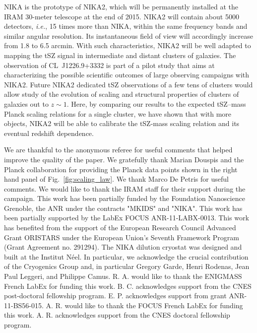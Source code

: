 \documentclass[twocolumn,traditabstract]{aa}
\begin{document}
NIKA is the prototype of NIKA2, which will be permanently installed at the IRAM 30-meter telescope at the end of 2015. NIKA2 will contain about 5000 detectors, {\it i.e.}, 15 times more than NIKA, within the same frequency bands and similar angular resolution. Its instantaneous field of view will accordingly increase from 1.8 to 6.5 arcmin. With such characteristics, NIKA2 will be well adapted to mapping the tSZ signal in intermediate and distant clusters of galaxies. The observation of \mbox{CL~J1226.9+3332} is part of a pilot study that aims at characterizing the possible scientific outcomes of large observing campaigns with NIKA2. Future NIKA2 dedicated tSZ observations of a few tens of clusters would allow study of the evolution of scaling and structural properties of clusters of galaxies out to $z \sim 1$. Here, by comparing our results to the expected tSZ--mass Planck scaling relations for a single cluster, we have shown that with more objects, NIKA2 will be able to calibrate the tSZ-mass scaling relation and its eventual redshift dependence. 

\begin{acknowledgements}
We are thankful to the anonymous referee for useful comments that helped improve the quality of the paper.
We gratefully thank Marian Douspis and the Planck collaboration for providing the Planck data points shown in the right hand panel of Fig.~\ref{fig:scaling_law}.
We thank Marco De Petris for useful comments.
We would like to thank the IRAM staff for their support during the campaign.
This work has been partially funded by the Foundation Nanoscience Grenoble, the ANR under the contracts "MKIDS" and "NIKA". 
This work has been partially supported by the LabEx FOCUS ANR-11-LABX-0013. 
This work has benefited from the support of the European Research Council Advanced Grant ORISTARS under the European Union's Seventh Framework Program (Grant Agreement no. 291294).
The NIKA dilution cryostat was designed and built at the Institut N\'eel. In particular, we acknowledge the crucial contribution of the Cryogenics Group and, in particular Gregory Garde, Henri Rodenas, Jean Paul Leggeri, and Philippe Camus. 
R. A. would like to thank the ENIGMASS French LabEx for funding this work. 
B. C. acknowledges support from the CNES post-doctoral fellowship program. 
E. P. acknowledges support from grant ANR-11-BS56-015. 
A. R. would like to thank the FOCUS French LabEx for funding this work.
A. R. acknowledges support from the CNES doctoral fellowship program.
\end{acknowledgements}


\end{document}
